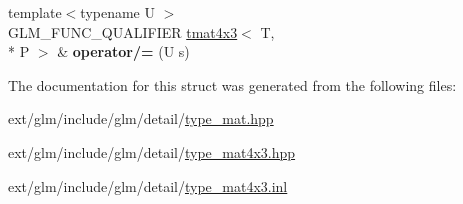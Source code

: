\begin{DoxyCompactItemize}
\item 
\hypertarget{structglm_1_1tmat4x3_ab1383b67bc01f049a43804b2253384b9}{{\footnotesize template$<$typename U $>$ }\\G\-L\-M\-\_\-\-F\-U\-N\-C\-\_\-\-Q\-U\-A\-L\-I\-F\-I\-E\-R \hyperlink{structglm_1_1tmat4x3}{tmat4x3}$<$ T, \\*
P $>$ \& {\bfseries operator/=} (U s)}\label{structglm_1_1tmat4x3_ab1383b67bc01f049a43804b2253384b9}

\end{DoxyCompactItemize}


The documentation for this struct was generated from the following files\-:\begin{DoxyCompactItemize}
\item 
ext/glm/include/glm/detail/\hyperlink{type__mat_8hpp}{type\-\_\-mat.\-hpp}\item 
ext/glm/include/glm/detail/\hyperlink{type__mat4x3_8hpp}{type\-\_\-mat4x3.\-hpp}\item 
ext/glm/include/glm/detail/\hyperlink{type__mat4x3_8inl}{type\-\_\-mat4x3.\-inl}\end{DoxyCompactItemize}
